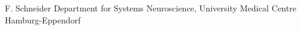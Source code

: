 
                {F. Schneider}
                {Department for Systems Neuroscience, University Medical Centre Hamburg-Eppendorf}
                